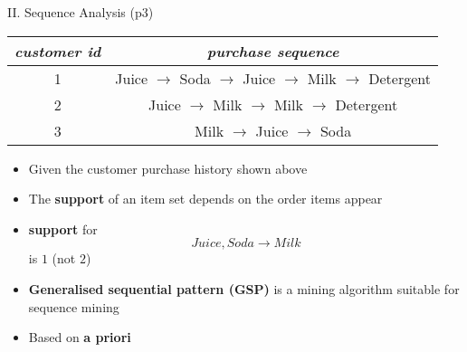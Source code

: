 \documentclass[handout]{beamer}
\newcommand{\strong}[1]{\textbf{\color{teal} #1}}
\begin{document}
\begin{frame}{II. Sequence Analysis (p3)}
\begin{center}
\begin{tabular}{|c|c|}
\emph{customer id} & \emph{purchase sequence} \\
\hline
1 & Juice $\rightarrow$ Soda $\rightarrow$ Juice $\rightarrow$ Milk $\rightarrow$ Detergent \\
\hline
2 &  Juice $\rightarrow$ Milk $\rightarrow$ Milk $\rightarrow$ Detergent \\
\hline
3 &  Milk $\rightarrow$ Juice $\rightarrow$ Soda \\
\hline
\end{tabular}
\end{center}
\begin{itemize}
\item Given the customer purchase history shown above
\item The \strong{support} of an item set depends on the order items appear
\item \strong{support} for
\[
	Juice, Soda \rightarrow Milk
\]
is $1$ (not $2$)
\item \strong{Generalised sequential pattern (GSP)} is a mining algorithm suitable for sequence mining~\cite{agrawal-srikant-ieee:1995}
\item[] Based on \strong{a priori} 
\end{itemize}
\end{frame}



\end{document}
